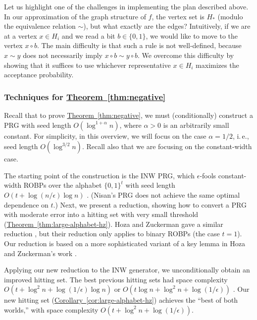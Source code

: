 \documentclass[11pt]{article}
\numberwithin{equation}{section}
\theoremstyle{definition}
\theoremstyle{plain}
\newcommand{\ie}{i.\,e.}
\newcommand{\expref}[2]{\hyperref[#2]{#1~\ref{#2}}}
\begin{document}
Let us highlight one of the challenges in implementing the plan described above. In our approximation of the graph structure of $f$, the vertex set is $H_*$ (modulo the equivalence relation $\sim$), but what exactly are the edges? Intuitively, if we are at a vertex $x \in H_i$ and we read a bit $b \in \{0, 1\}$, we would like to move to the vertex $x \circ b$. The main difficulty is that such a rule is not well-defined, because $x \sim y$ does not necessarily imply $x \circ b \sim y \circ b$. We overcome this difficulty by showing that it suffices to use whichever representative $x \in H_i$ maximizes the acceptance probability.

\subsubsection{Techniques for \expref{Theorem}{thm:negative}} \label{sec:negative-techniques}

Recall that to prove \expref{Theorem}{thm:negative}, we must (conditionally) construct a PRG with seed length $O(\log^{1 + \alpha} n)$, where $\alpha > 0$ is an arbitrarily small constant. For simplicity, in this overview, we will focus on the case $\alpha = 1/2$, \ie, seed length $O(\log^{3/2} n)$. Recall also that we are focusing on the constant-width case. 

The starting point of the construction is the INW PRG, which $\epsilon$-fools constant-width ROBPs over the alphabet $\{0, 1\}^t$ with seed length $O(t + \log(n/\epsilon) \log n)$ \cite{INW94}. (Nisan's PRG \cite{Nis92} does not achieve the same optimal dependence on $t$.) Next, we present a reduction, showing how to convert a PRG with moderate error into a hitting set with very small threshold (\expref{Theorem}{thm:large-alphabet-hz}). Hoza and Zuckerman gave a similar reduction \cite{HZ20}, but their reduction only applies to binary ROBPs (the case $t = 1$). Our reduction is based on a more sophisticated variant of a key lemma in Hoza and Zuckerman's work \cite{HZ20}.

Applying our new reduction to the INW generator, we unconditionally obtain an improved hitting set. The best previous hitting sets had space complexity $O(t + \log^2 n + \log(1/\epsilon) \log n)$ \cite{INW94} or $O(t \log n + \log^2 n + \log(1/\epsilon))$ \cite{HZ20}. Our new hitting set (\expref{Corollary}{cor:large-alphabet-hz}) achieves the ``best of both worlds,'' with space complexity $O(t + \log^2 n + \log(1/\epsilon))$.
\end{document}
